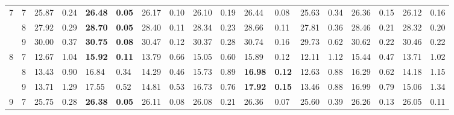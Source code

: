 \documentclass[conference]{IEEEtran}
\begin{document}
\begin{table}[]
\begin{tabular}{|cc|ll|ll|ll|ll|ll|ll|ll|ll|}
		\multicolumn{1}{|c|}{\multirow{3}{*}{7}} & 7 & \multicolumn{1}{l|}{25.87} & 0.24 & \multicolumn{1}{l|}{\textbf{26.48}} & \textbf{0.05} & \multicolumn{1}{l|}{26.17} & 0.10 & \multicolumn{1}{l|}{26.10} & 0.19 & \multicolumn{1}{l|}{26.44} & 0.08 & \multicolumn{1}{l|}{25.63} & 0.34 & \multicolumn{1}{l|}{26.36} & 0.15 & \multicolumn{1}{l|}{26.12} & 0.16 \\ \cline{2-18} 
		\multicolumn{1}{|c|}{} & 8 & \multicolumn{1}{l|}{27.92} & 0.29 & \multicolumn{1}{l|}{\textbf{28.70}} & \textbf{0.05} & \multicolumn{1}{l|}{28.40} & 0.11 & \multicolumn{1}{l|}{28.34} & 0.23 & \multicolumn{1}{l|}{28.66} & 0.11 & \multicolumn{1}{l|}{27.81} & 0.36 & \multicolumn{1}{l|}{28.46} & 0.21 & \multicolumn{1}{l|}{28.32} & 0.20 \\ \cline{2-18} 
		\multicolumn{1}{|c|}{} & 9 & \multicolumn{1}{l|}{30.00} & 0.37 & \multicolumn{1}{l|}{\textbf{30.75}} & \textbf{0.08} & \multicolumn{1}{l|}{30.47} & 0.12 & \multicolumn{1}{l|}{30.37} & 0.28 & \multicolumn{1}{l|}{30.74} & 0.16 & \multicolumn{1}{l|}{29.73} & 0.62 & \multicolumn{1}{l|}{30.62} & 0.22 & \multicolumn{1}{l|}{30.46} & 0.22 \\ \hline
		\multicolumn{1}{|c|}{\multirow{3}{*}{8}} & 7 & \multicolumn{1}{l|}{12.67} & 1.04 & \multicolumn{1}{l|}{\textbf{15.92}} & \textbf{0.11} & \multicolumn{1}{l|}{13.79} & 0.66 & \multicolumn{1}{l|}{15.05} & 0.60 & \multicolumn{1}{l|}{15.89} & 0.12 & \multicolumn{1}{l|}{12.11} & 1.12 & \multicolumn{1}{l|}{15.44} & 0.47 & \multicolumn{1}{l|}{13.71} & 1.02 \\ \cline{2-18} 
		\multicolumn{1}{|c|}{} & 8 & \multicolumn{1}{l|}{13.43} & 0.90 & \multicolumn{1}{l|}{16.84} & 0.34 & \multicolumn{1}{l|}{14.29} & 0.46 & \multicolumn{1}{l|}{15.73} & 0.89 & \multicolumn{1}{l|}{\textbf{16.98}} & \textbf{0.12} & \multicolumn{1}{l|}{12.63} & 0.88 & \multicolumn{1}{l|}{16.29} & 0.62 & \multicolumn{1}{l|}{14.18} & 1.15 \\ \cline{2-18} 
		\multicolumn{1}{|c|}{} & 9 & \multicolumn{1}{l|}{13.71} & 1.29 & \multicolumn{1}{l|}{17.55} & 0.52 & \multicolumn{1}{l|}{14.81} & 0.53 & \multicolumn{1}{l|}{16.73} & 0.76 & \multicolumn{1}{l|}{\textbf{17.92}} & \textbf{0.15} & \multicolumn{1}{l|}{13.46} & 0.88 & \multicolumn{1}{l|}{16.99} & 0.79 & \multicolumn{1}{l|}{15.06} & 1.34 \\ \hline
		\multicolumn{1}{|c|}{\multirow{3}{*}{9}} & 7 & \multicolumn{1}{l|}{25.75} & 0.28 & \multicolumn{1}{l|}{\textbf{26.38}} & \textbf{0.05} & \multicolumn{1}{l|}{26.11} & 0.08 & \multicolumn{1}{l|}{26.08} & 0.21 & \multicolumn{1}{l|}{26.36} & 0.07 & \multicolumn{1}{l|}{25.60} & 0.39 & \multicolumn{1}{l|}{26.26} & 0.13 & \multicolumn{1}{l|}{26.05} & 0.11 \\ \cline{2-18} 

\end{tabular}
\end{table}
\end{document}
